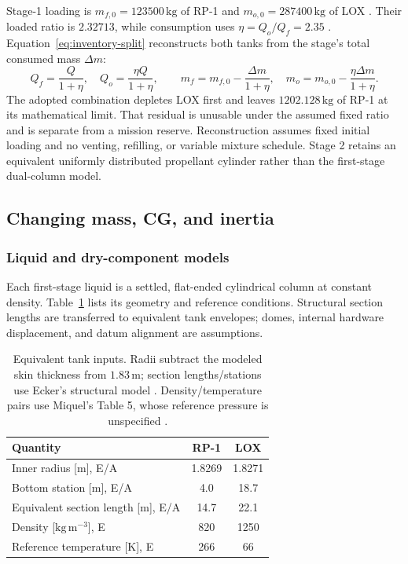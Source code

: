 Stage-1 loading is $m_{f,0}=123500\,\mathrm{kg}$ of RP-1 and $m_{o,0}=287400\,\mathrm{kg}$ of LOX \cite{romerocalco2023}. Their loaded ratio is $2.32713$, while consumption uses $\eta=Q_o/Q_f=2.35$ \cite{bykerk2023}. Equation~\eqref{eq:inventory-split} reconstructs both tanks from the stage's total consumed mass $\Delta m$:
\begin{equation}
 Q_f=\frac{Q}{1+\eta},\quad Q_o=\frac{\eta Q}{1+\eta},\qquad
 m_f=m_{f,0}-\frac{\Delta m}{1+\eta},\quad
 m_o=m_{o,0}-\frac{\eta\Delta m}{1+\eta}.
\label{eq:inventory-split}
\end{equation}
The adopted combination depletes LOX first and leaves $1202.128\,\mathrm{kg}$ of RP-1 at its mathematical limit. That residual is unusable under the assumed fixed ratio and is separate from a mission reserve. Reconstruction assumes fixed initial loading and no venting, refilling, or variable mixture schedule. Stage 2 retains an equivalent uniformly distributed propellant cylinder rather than the first-stage dual-column model.

\subsection{Changing mass, CG, and inertia}
\subsubsection{Liquid and dry-component models}
Each first-stage liquid is a settled, flat-ended cylindrical column at constant density. Table~\ref{tab:tank-model} lists its geometry and reference conditions. Structural section lengths are transferred to equivalent tank envelopes; domes, internal hardware displacement, and datum alignment are assumptions.

\begin{table}[!htbp]
\centering\small
\begin{tabular}{@{}lcc@{}}
\toprule
Quantity & RP-1 & LOX \\
\midrule
Inner radius [m], E/A & 1.8269 & 1.8271 \\
Bottom station [m], E/A & 4.0 & 18.7 \\
Equivalent section length [m], E/A & 14.7 & 22.1 \\
Density [$\mathrm{kg\,m^{-3}}$], E & 820 & 1250 \\
Reference temperature [K], E & 266 & 66 \\
\bottomrule
\end{tabular}
\caption{Equivalent tank inputs. Radii subtract the modeled skin thickness from $1.83\,\mathrm{m}$; section lengths/stations use Ecker's structural model \cite[Table 1]{ecker2017}. Density/temperature pairs use Miquel's Table 5, whose reference pressure is unspecified \cite{miquel2020}.}
\label{tab:tank-model}
\end{table}

